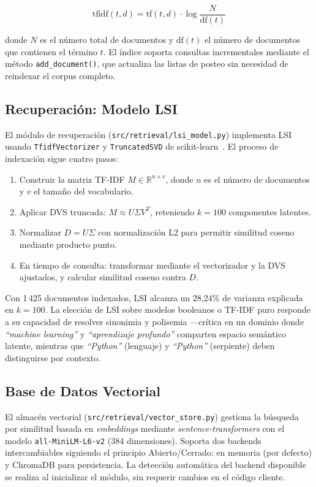 \documentclass[runningheads,a4paper]{llncs}
\begin{document}
$$\text{tfidf}(t, d) = \text{tf}(t, d) \cdot \log\frac{N}{\text{df}(t)}$$

donde $N$ es el número total de documentos y $\text{df}(t)$ el número de documentos que contienen el término $t$. El índice soporta consultas incrementales mediante el método \texttt{add\_document()}, que actualiza las listas de posteo sin necesidad de reindexar el corpus completo.

\subsection{Recuperación: Modelo LSI}

El módulo de recuperación (\texttt{src/retrieval/lsi\_model.py}) implementa LSI usando \texttt{TfidfVectorizer} y \texttt{TruncatedSVD} de scikit-learn~\cite{sklearn}. El proceso de indexación sigue cuatro pasos:

\begin{enumerate}
\item Construir la matriz TF-IDF $M \in \mathbb{R}^{n \times v}$, donde $n$ es el número de documentos y $v$ el tamaño del vocabulario.
\item Aplicar DVS truncada: $M \approx U \Sigma V^T$, reteniendo $k=100$ componentes latentes.
\item Normalizar $D = U\Sigma$ con normalización L2 para permitir similitud coseno mediante producto punto.
\item En tiempo de consulta: transformar mediante el vectorizador y la DVS ajustados, y calcular similitud coseno contra $D$.
\end{enumerate}

Con 1\,425 documentos indexados, LSI alcanza un 28,24\% de varianza explicada en $k=100$. La elección de LSI sobre modelos booleanos o TF-IDF puro responde a su capacidad de resolver sinonimia y polisemia —crítica en un dominio donde \emph{``machine learning''} y \emph{``aprendizaje profundo''} comparten espacio semántico latente, mientras que \emph{``Python''} (lenguaje) y \emph{``Python''} (serpiente) deben distinguirse por contexto.

\subsection{Base de Datos Vectorial}

El almacén vectorial (\texttt{src/retrieval/vector\_store.py}) gestiona la búsqueda por similitud basada en \emph{embeddings} mediante \emph{sentence-transformers} con el modelo \texttt{all-MiniLM-L6-v2} (384 dimensiones). Soporta dos backends intercambiables siguiendo el principio Abierto/Cerrado: en memoria (por defecto) y ChromaDB para persistencia. La detección automática del backend disponible se realiza al inicializar el módulo, sin requerir cambios en el código cliente.
\end{document}
